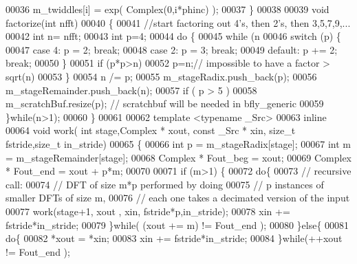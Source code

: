 \begin{DoxyCode}
00036         m\_twiddles[i] = exp( Complex(0,i*phinc) );
00037     \}
00038 
00039   \textcolor{keywordtype}{void} factorize(\textcolor{keywordtype}{int} nfft)
00040   \{
00041     \textcolor{comment}{//start factoring out 4's, then 2's, then 3,5,7,9,...}
00042     \textcolor{keywordtype}{int} n= nfft;
00043     \textcolor{keywordtype}{int} p=4;
00044     \textcolor{keywordflow}{do} \{
00045       \textcolor{keywordflow}{while} (n %
00046         \textcolor{keywordflow}{switch} (p) \{
00047           \textcolor{keywordflow}{case} 4: p = 2; \textcolor{keywordflow}{break};
00048           \textcolor{keywordflow}{case} 2: p = 3; \textcolor{keywordflow}{break};
00049           \textcolor{keywordflow}{default}: p += 2; \textcolor{keywordflow}{break};
00050         \}
00051         \textcolor{keywordflow}{if} (p*p>n)
00052           p=n;\textcolor{comment}{// impossible to have a factor > sqrt(n)}
00053       \}
00054       n /= p;
00055       m\_stageRadix.push\_back(p);
00056       m\_stageRemainder.push\_back(n);
00057       \textcolor{keywordflow}{if} ( p > 5 )
00058         m\_scratchBuf.resize(p); \textcolor{comment}{// scratchbuf will be needed in bfly\_generic}
00059     \}\textcolor{keywordflow}{while}(n>1);
00060   \}
00061 
00062   \textcolor{keyword}{template} <\textcolor{keyword}{typename} \_Src>
00063     \textcolor{keyword}{inline}
00064     \textcolor{keywordtype}{void} work( \textcolor{keywordtype}{int} stage,Complex * xout, \textcolor{keyword}{const} \_Src * xin, \textcolor{keywordtype}{size\_t} fstride,\textcolor{keywordtype}{size\_t} in\_stride)
00065     \{
00066       \textcolor{keywordtype}{int} p = m\_stageRadix[stage];
00067       \textcolor{keywordtype}{int} m = m\_stageRemainder[stage];
00068       Complex * Fout\_beg = xout;
00069       Complex * Fout\_end = xout + p*m;
00070 
00071       \textcolor{keywordflow}{if} (m>1) \{
00072         \textcolor{keywordflow}{do}\{
00073           \textcolor{comment}{// recursive call:}
00074           \textcolor{comment}{// DFT of size m*p performed by doing}
00075           \textcolor{comment}{// p instances of smaller DFTs of size m, }
00076           \textcolor{comment}{// each one takes a decimated version of the input}
00077           work(stage+1, xout , xin, fstride*p,in\_stride);
00078           xin += fstride*in\_stride;
00079         \}\textcolor{keywordflow}{while}( (xout += m) != Fout\_end );
00080       \}\textcolor{keywordflow}{else}\{
00081         \textcolor{keywordflow}{do}\{
00082           *xout = *xin;
00083           xin += fstride*in\_stride;
00084         \}\textcolor{keywordflow}{while}(++xout != Fout\_end );

\end{DoxyCode}
